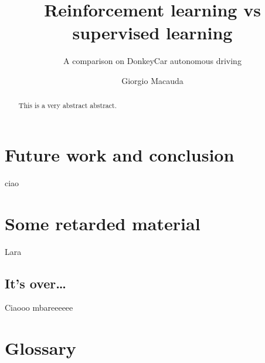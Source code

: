 \documentclass[mscthesis]{usiinfthesis}
\title{Reinforcement learning vs supervised learning} %
\subtitle{A comparison on DonkeyCar autonomous driving} %
\author{Giorgio Macauda} %
\begin{document}
\maketitle %

\frontmatter %

\begin{abstract}
This is a very abstract abstract. 

\lipsum
\end{abstract}
\begin{acknowledgements}
\lipsum 
\end{acknowledgements}

\tableofcontents 
\listoffigures %
\listoftables %

\mainmatter








\chapter{Future work and conclusion}
ciao

\appendix %

\chapter{Some retarded material}
Lara
\section{It's over\dots}
Ciaooo mbareeeeee

\backmatter

\chapter{Glossary} %

%
%



\end{document}
